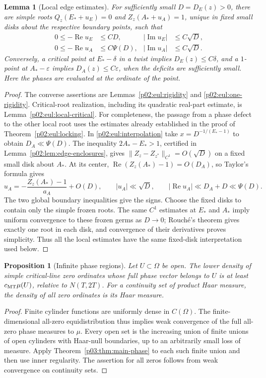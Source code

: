 \documentclass[11pt,letterpaper]{article}
\newtheorem{lemma}[theorem]{Lemma}
\newtheorem{proposition}[theorem]{Proposition}
\theoremstyle{definition}
\theoremstyle{remark}
\newcommand{\eps}{\varepsilon}
\renewcommand{\Re}{\operatorname{Re}}
\renewcommand{\Im}{\operatorname{Im}}
\newcommand{\1}{\mathbf 1}
\begin{document}
\begin{lemma}[Local edge estimates]\label{p03:lem:local-edges}For sufficiently small $D=D_E(z)>0$, there are simple roots
$Q_z(E_*+u_E)=0$ and $Z_z(A_*+u_A)=1$, unique in fixed
small disks about the respective boundary points, such that
\begin{align*}
 0\le-\Re u_E&\le CD,& |\Im u_E|&\le C\sqrt D,\\
 0\le-\Re u_A&\le C\Psi(D),& |\Im u_A|&\le C\sqrt D.
\end{align*}
Conversely, a critical point at $E_*-\delta$ in a twist implies
$D_E(z)\le C\delta$, and a $1$-point at $A_*-\eps$ implies
$D_A(z)\le C\eps$, when the deficits are sufficiently small.
Here the phases are evaluated at the ordinate of the point.
\end{lemma}
\begin{proof}
The converse assertions are Lemmas~\ref{p02:eul:rigidity} and
\ref{p02:eul:one-rigidity}. Critical-root realization, including its
quadratic real-part estimate, is Lemma~\ref{p02:eul:local-critical}.
For completeness, the passage from a phase defect to the other
local root uses the estimates already established in the proof of
Theorem~\ref{p02:eul:locking}. In \eqref{p02:eul:interpolation} take
$x=D^{-1/(E_*-1)}$ to obtain $D_A\ll\Psi(D)$. The inequality
$2A_*-E_*>1$, certified in Lemma~\ref{p02:lem:edge-enclosures},
gives $\|Z_z-Z_{z^*}\|_{C^1}=O(\sqrt D)$ on a fixed small disk
about $A_*$. At its center,
$\Re(Z_z(A_*)-1)=O(D_A)$, so Taylor's formula gives
\[
 u_A=-\frac{Z_z(A_*)-1}{a_A}+O(D),\qquad
 |u_A|\ll\sqrt D,\qquad
 |\Re u_A|\ll D_A+D\ll\Psi(D).
\]
The two global boundary inequalities give the signs. Choose the
fixed disks to contain only the simple frozen roots. The same
$C^1$ estimates at $E_*$ and $A_*$ imply uniform convergence to
these frozen germs as $D\to0$; Rouch\'e's theorem gives exactly
one root in each disk, and convergence of their derivatives proves
simplicity. Thus all the local estimates have the same fixed-disk
interpretation used below.
\end{proof}

\begin{proposition}[Infinite phase regions]\label{p03:prop:infinite-phases}
Let $U\subset\Omega$ be open. The lower density of simple
critical-line zero ordinates whose full phase vector belongs to
$U$ is at least $c_{\rm MT}\mu(U)$, relative to $N(T,2T)$.
For a continuity set of product Haar measure, the density of all
zero ordinates is its Haar measure.
\end{proposition}
\begin{proof}
Finite cylinder functions are uniformly dense in $C(\Omega)$.
The finite-dimensional all-zero equidistribution thus implies weak
convergence of the full all-zero phase measures to $\mu$.
Every open set is the increasing union of finite unions of open
cylinders with Haar-null boundaries, up to an arbitrarily small
loss of measure. Apply Theorem~\ref{p03:thm:main-phase} to each such
finite union and then use inner regularity. The assertion for all
zeros follows from weak convergence on continuity sets.
\end{proof}
\end{document}
